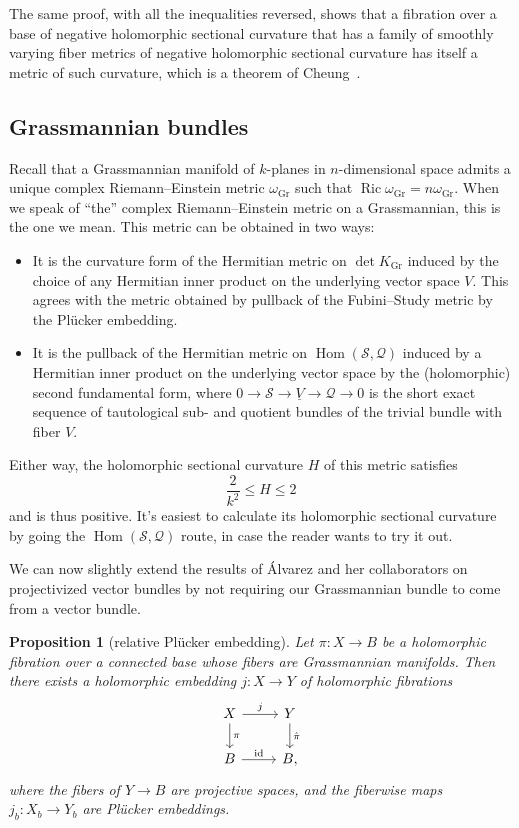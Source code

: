 \documentclass[10pt,a4paper]{amsart}
\newtheorem{prop}[theo]{Proposition}
\theoremstyle{definition}
\newcommand{\cc}[1]{\mathcal{#1}}
\DeclareMathOperator{\Ric}{Ric}
\DeclareMathOperator{\Gr}{Gr}
\DeclareMathOperator{\Hom}{Hom}
\DeclareMathOperator{\id}{id}
\def\kahlerEinstein{complex Riemann--Einstein}
\begin{document}
The same proof, with all the inequalities reversed, shows that a fibration over
a base of negative holomorphic sectional curvature that has a family of
smoothly varying fiber metrics of negative holomorphic sectional curvature has
itself a metric of such curvature, which is a theorem of Cheung~\cite{cheung}.




\subsection*{Grassmannian bundles}



Recall that a Grassmannian manifold of $k$-planes in $n$-dimensional space
admits a unique \kahlerEinstein{} metric $\omega_{\Gr}$ such that
$\Ric \omega_{\Gr} = n \omega_{\Gr}$.
When we speak of ``the'' \kahlerEinstein{} metric on a Grassmannian, this is the one we mean.
This metric can be obtained in two ways:

\begin{itemize}
  \item It is the curvature form of the Hermitian metric on $\det K_{\Gr}$ induced by the choice of any Hermitian inner product on the underlying vector space $V$. This agrees with the metric obtained by pullback of the Fubini--Study metric by the Pl\"ucker embedding.

  \item It is the pullback of the Hermitian metric on $\Hom(\cc S, \cc Q)$ induced by a Hermitian inner product on the underlying vector space by the (holomorphic) second fundamental form, where $0 \to \cc S \to \underline {V} \to \cc Q \to 0$ is the short exact sequence of tautological sub- and quotient bundles of the trivial bundle with fiber $V$.
\end{itemize}

Either way, the holomorphic sectional curvature $H$ of this metric satisfies
\[
  \frac{2}{k^{2}} \leq H \leq 2
\]
and is thus positive.
It's easiest to calculate its holomorphic sectional curvature by going the $\Hom(\cc S, \cc Q)$ route, in case the reader wants to try it out.

We can now slightly extend the results of \'Alvarez and her collaborators on projectivized vector bundles by not requiring our Grassmannian bundle to come from a vector bundle.







\begin{prop}[relative Pl\"ucker embedding]
Let $\pi : X \to B$ be a holomorphic fibration over a connected base whose fibers are Grassmannian manifolds.
Then there exists a holomorphic embedding $j : X \to Y$ of holomorphic fibrations
\[
\begin{tikzcd}
  X \ar[d,"\pi"] \ar[r,"j"] & Y \ar[d,"\hat\pi"]
  \\
  B \ar[r,"\id"] & B,
\end{tikzcd}
\]
where the fibers of $Y \to B$ are projective spaces, and the fiberwise maps $j_{b} : X_{b} \to Y_{b}$ are Pl\"ucker embeddings.
\end{prop}
\end{document}
